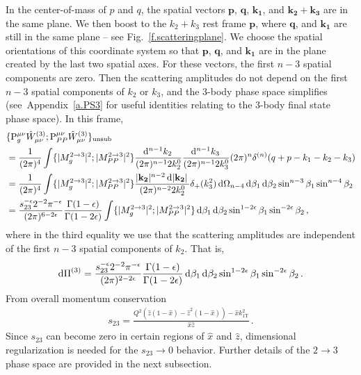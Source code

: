 \documentclass[prd,preprintnumbers,nofootinbib,superscriptaddress,onecolumn,preprint]{revtex4-1}
\newcommand\3[1]{\boldsymbol{#1}}
\newcommand{\Tscsq}[2]{#1^2_{#2\text{T}}}
\newcommand{\contractor}[1]{\ensuremath{{\rm P}}_{#1}}
\newcommand{\ps}{\ensuremath{\Pi}}
\newcommand{\fref}[1]{Fig.~\ref{f.#1}}
\newcommand{\aref}[1]{Appendix~\ref{a.#1}}
\begin{document}
In the center-of-mass of $p$ and $q$, the spatial vectors $\bm{p}$,
$\bm{q}$, $\bm{k_1}$, and $\bm{k_2}+\bm{k_3}$ are in the same plane.
We then boost to the $k_2+k_3$ rest frame $\bm{p}$, where $\bm{q}$,
and $\bm{k_1}$ are still in the same plane -- see
\fref{scatteringplane}. We choose the spatial orientations of this
coordinate system so that $\bm{p}$, $\bm{q}$, and $\bm{k_1}$ are in
the plane created by the last two spatial axes. For these vectors, the
first $n-3$ spatial components are zero. Then the scattering
amplitudes do not depend on the first $n-3$ spatial components of
$k_2$ or $k_3$, and the 3-body phase space simplifies (see~\aref{PS3}
for useful identities relating to the 3-body final state phase space).
In this frame,
%
\begin{align}
&{}  
  \{\contractor{g}^{\mu \nu}  \hat{W}^{(3)}_{\mu\nu};
    \contractor{PP}^{\mu \nu} \hat{W}^{(3)}_{\mu\nu}\}_{{\rm unsub}}
  \nonumber \\
&{}=  
  \frac{1}{(2 \pi)^4} \int 
  \{\lvert M^{2\to 3}_g\rvert^2;\lvert M^{2\to 3}_{PP}\rvert^2\} 
  \frac{\diff{^{n-1} k_2}{} }{(2 \pi)^{n-1} 2 k_2^0} 
  \frac{\diff{^{n-1} k_3}{} }{(2 \pi)^{n-1} 2 k_3^0}
  (2 \pi)^{n} \delta^{(n)}(q + p - k_1 - k_2 - k_3)
  \nonumber\\ 
&{}=  
  \frac{1}{(2 \pi)^4} \int 
  \{\lvert M^{2\to 3}_g\rvert^2;\lvert M^{2\to 3}_{PP}\rvert^2\} 
  \frac{|{\bf k_2}|^{n-2}\diff{|{\bf k_2}|}{} }{(2 \pi)^{n-2} 2 k_2^0} 
  \delta_+(k_3^2)
  \diff{\Omega_{n-4}}
  \diff{\beta_1}
  \diff{\beta_2}
  \sin^{n-3}\beta_1 
  \sin^{n-4}\beta_2
  \nonumber\\ 
&{}=  
  \frac{s_{23}^{-\epsilon}2^{-2} \pi^{-\epsilon}}{(2\pi)^{6-2\epsilon}} 
   \frac{\Gamma(1 - \epsilon)}{\Gamma(1 - 2 \epsilon)}
  \int \{\lvert M^{2\to 3}_g\rvert^2;\lvert M^{2\to 3}_{PP}\rvert^2\} 
  \diff{\beta_1}
  \diff{\beta_2}
  \sin^{1-2\epsilon}\beta_1 
  \sin^{-2\epsilon}\beta_2
  \, , \label{e.23ps}
\end{align}
%
where in the third equality we use that the scattering amplitudes are
independent of the first $n-3$ spatial components of $k_2$. That is,
%
\begin{equation}
\diff{\ps}^{(3)}  =
\frac{s_{23}^{-\epsilon} 2^{-2} \pi^{-\epsilon}}{(2\pi)^{2-2\epsilon}} 
  \frac{\Gamma(1 - \epsilon)}{\Gamma(1 - 2 \epsilon)}
  \diff{\beta_1}
  \diff{\beta_2}
  \sin^{1-2\epsilon}\beta_1 
  \sin^{-2\epsilon}\beta_2
  \, . \label{e.2to3ps}
\end{equation} 
%
From overall momentum conservation
%
\begin{align}
s_{23}=
\frac{Q^2 (\hat{z} (1 - \hat{x}) - \hat{z}^2 (1 - \hat{x}) ) - \hat{x} \Tscsq{k}{1}}
     {\hat{x} \hat{z}} \, .
\end{align}
%
Since $s_{23}$ can become zero in certain regions of $\hat{x}$ and
$\hat{z}$, dimensional regularization is needed for the $s_{23}\to0$
behavior. Further details of the $2 \to 3$ phase space are provided in
the next subsection. 
\end{document}
